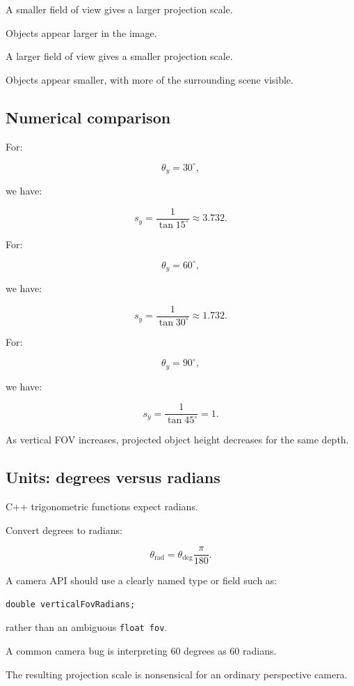 A smaller field of view gives a larger projection scale.

Objects appear larger in the image.

A larger field of view gives a smaller projection scale.

Objects appear smaller, with more of the surrounding scene visible.

\subsection{Numerical comparison}\label{02-foundations-ii-ch033-numerical-comparison}

For:

\[
 \theta_y=30^\circ,
\]

we have:

\[
 s_y=\frac1{\tan15^\circ}\approx3.732.
\]

For:

\[
 \theta_y=60^\circ,
\]

we have:

\[
 s_y=\frac1{\tan30^\circ}\approx1.732.
\]

For:

\[
 \theta_y=90^\circ,
\]

we have:

\[
 s_y=\frac1{\tan45^\circ}=1.
\]

As vertical FOV increases, projected object height decreases for the same depth.

\subsection{Units: degrees versus radians}\label{02-foundations-ii-ch033-units-degrees-versus-radians}

C++ trigonometric functions expect radians.

Convert degrees to radians:

\[
 \boxed{ \theta_{\mathrm{rad}}= \theta_{\mathrm{deg}}\frac\pi{180} }.
\]

A camera API should use a clearly named type or field such as:

\begin{verbatim}
double verticalFovRadians;
\end{verbatim}

rather than an ambiguous \texttt{float\ fov}.

A common camera bug is interpreting 60 degrees as 60 radians.

The resulting projection scale is nonsensical for an ordinary perspective camera.

